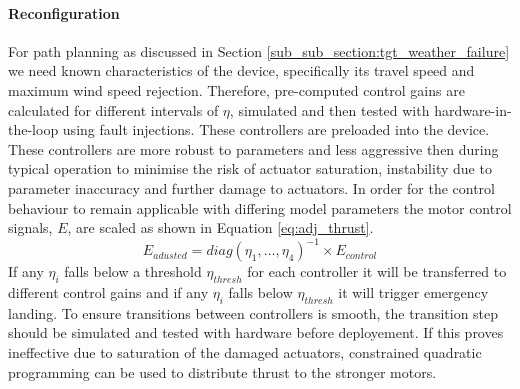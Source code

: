 \paragraph{Reconfiguration}
For path planning as discussed in Section \ref{sub_sub_section:tgt_weather_failure} we need known characteristics of the device, specifically its travel speed and maximum wind speed rejection. Therefore, pre-computed control gains are calculated for different intervals of $\eta$, simulated and then tested with hardware-in-the-loop using fault injections. These controllers are preloaded into the device. These controllers are more robust to parameters and less aggressive then during typical operation to minimise the risk of actuator saturation, instability due to parameter inaccuracy and further damage to actuators. In order for the control behaviour to remain applicable with differing model parameters the motor control signals, $E$, are scaled as shown in Equation \ref{eq:adj_thrust}.
\begin{equation}\label{eq:adj_thrust}
    E_{adusted} = diag(\eta_1, \dots,\eta_4)^{-1}\times E_{control}
\end{equation}
If any $\eta_i$ falls below a threshold $\eta_{thresh}$ for each controller it will be transferred to different control gains and if any $\eta_i$ falls below $\eta_{thresh}$ it will trigger emergency landing. To ensure transitions between controllers is smooth, the transition step should be simulated and tested with hardware before deployement. If this proves ineffective due to saturation of the damaged actuators, constrained quadratic programming can be used \cite{JOHANSEN2013} to distribute thrust to the stronger motors.

